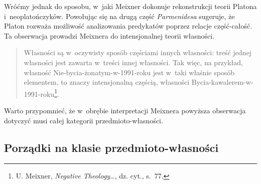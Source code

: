 Wróćmy jednak do sposobu, w~jaki Meixner dokonuje rekonstrukcji teorii Platona i~neoplatończyków. Powołując się na drugą część \textit{Parmenidesa} sugeruje, że Platon rozważa możliwość analizowania predykatów poprzez relacje część-całość. Ta obserwacja prowadzi Meixnera do intensjonalnej teorii własności.

\begin{quote}
Własności są w~oczywisty sposób częściami innych własności: treść jednej własności jest zawarta w~treści innej własności. Tak więc, na przykład, własność Nie-bycia-żonatym-w-1991-roku jest w~taki właśnie sposób elementem, to znaczy intensjonalną częścią, własności Bycia-kawalerem-w-1991-roku\footnote{U. Meixner, \textit{Negative Theology\ldots}, dz. cyt., s.~77.}.
\end{quote}
Warto przypomnieć, że w~obrębie interpretacji Meixnera powyższa obserwacja dotyczyć musi całej kategorii przedmioto-własności.

\subsection{Porządki na klasie przedmioto-własności}

